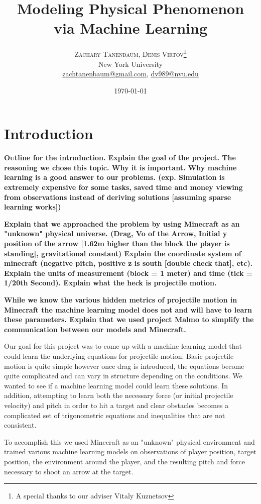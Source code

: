 \documentclass[twoside,twocolumn]{article}
\title{Modeling Physical Phenomenon via Machine Learning} %
\author{%
\textsc{Zachary Tanenbaum, Denis Virtov}\thanks{A special thanks to our adviser Vitaly Kuznetsov} \\[1ex] %
\normalsize New York University \\ %
\normalsize \href{mailto:zachtanenbaum@gmail.com}{zachtanenbaum@gmail.com}, \href{mailto:dv989@nyu.edu}{dv989@nyu.edu} %
}
\date{\today} %
\begin{document}
\maketitle


\section{Introduction}

\textbf{\lettrine[nindent=0em,lines=3]{O}utline for the introduction.
Explain the goal of the project.
The reasoning we chose this topic.
Why it is important.
Why machine learning is a good answer to our problems.
(exp. Simulation is extremely expensive for some tasks, saved time and money viewing from observations instead of deriving solutions [assuming sparse learning works])}

\textbf{Explain that we approached the problem by using Minecraft as an "unknown" physical universe. (Drag, Vo of the Arrow, Initial y position of the arrow [1.62m higher than the block the player is standing], gravitational constant)
Explain the coordinate system of minecraft (negative pitch, positive z is south [double check that], etc).
Explain the units of measurement (block = 1 meter) and time (tick = 1/20th Second).
Explain what the heck is projectile motion.}

\textbf{While we know the various hidden metrics of projectile motion in Minecraft the machine learning model does not and will have to learn these parameters.
Explain that we used project Malmo to simplify the communication between our models and Minecraft.}

Our goal for this project was to come up with a machine learning model that could learn the underlying equations for projectile motion. Basic projectile motion is quite simple however once drag is introduced, the equations become quite complicated and can vary in structure depending on the conditions. We wanted to see if a machine learning model could learn these solutions. In addition, attempting to learn both the necessary force (or initial projectile velocity) and pitch in order to hit a target and clear obstacles becomes a complicated set of trigonometric equations and inequalities that are not consistent.

To accomplish this we used Minecraft as an "unknown" physical environment and trained various machine learning models on observations of player position, target position, the environment around the player, and the resulting pitch and force necessary to shoot an arrow at the target.
\end{document}
